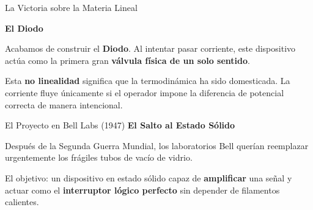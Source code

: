 \documentclass[10pt, aspectratio=169]{beamer}
\begin{document}
\begin{frame}{La Victoria sobre la Materia Lineal}
    \vspace{0.8cm}
    \begin{center}
        \huge \textbf{El Diodo}
    \end{center}
    
    \vspace{0.8cm}
    \normalsize
    Acabamos de construir el \textbf{Diodo}. Al intentar pasar corriente, este dispositivo actúa como la primera gran \textbf{válvula física de un solo sentido}.
    
    \vspace{0.4cm}
    Esta \alert{\textbf{no linealidad}} significa que la termodinámica ha sido domesticada. La corriente fluye únicamente si el operador impone la diferencia de potencial correcta de manera intencional.
\end{frame}


\begin{frame}{El Proyecto en Bell Labs (1947)}
    \vspace{0.4cm}
    \Large \textbf{El Salto al Estado Sólido}
    
    \vspace{0.6cm}
    \normalsize
    Después de la Segunda Guerra Mundial, los laboratorios Bell querían reemplazar urgentemente los frágiles tubos de vacío de vidrio.
    
    \vspace{0.4cm}
    El objetivo: un dispositivo en estado sólido capaz de \textbf{amplificar} una señal y actuar como el \textbf{interruptor lógico perfecto} sin depender de filamentos calientes.
\end{frame}
\end{document}
